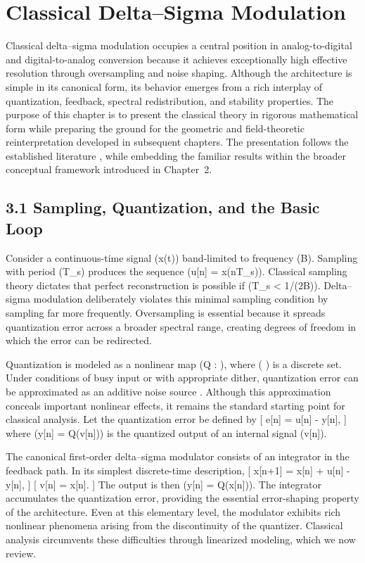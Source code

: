 \chapter{Classical Delta--Sigma Modulation}

Classical delta--sigma modulation occupies a central position in analog-to-digital and digital-to-analog conversion because it achieves exceptionally high effective resolution through oversampling and noise shaping. Although the architecture is simple in its canonical form, its behavior emerges from a rich interplay of quantization, feedback, spectral redistribution, and stability properties. The purpose of this chapter is to present the classical theory in rigorous mathematical form while preparing the ground for the geometric and field-theoretic reinterpretation developed in subsequent chapters. The presentation follows the established literature \citep{candy1992oversampling,schreier2005understanding}, while embedding the familiar results within the broader conceptual framework introduced in Chapter~2.

\section*{3.1 Sampling, Quantization, and the Basic Loop}

Consider a continuous-time signal (x(t)) band-limited to frequency (B). Sampling with period (T_s) produces the sequence (u[n] = x(nT_s)). Classical sampling theory dictates that perfect reconstruction is possible if (T_s < 1/(2B)). Delta--sigma modulation deliberately violates this minimal sampling condition by sampling far more frequently. Oversampling is essential because it spreads quantization error across a broader spectral range, creating degrees of freedom in which the error can be redirected.

Quantization is modeled as a nonlinear map (Q :  \to \Lambda), where ( \Lambda ) is a discrete set. Under conditions of busy input or with appropriate dither, quantization error can be approximated as an additive noise source \citep{widrow1956statistical,jayant1993digital}. Although this approximation conceals important nonlinear effects, it remains the standard starting point for classical analysis. Let the quantization error be defined by
[
e[n] = u[n] - y[n],
]
where (y[n] = Q(v[n])) is the quantized output of an internal signal (v[n]).

The canonical first-order delta--sigma modulator consists of an integrator in the feedback path. In its simplest discrete-time description,
[
x[n+1] = x[n] + u[n] - y[n],
]
[
v[n] = x[n].
]
The output is then (y[n] = Q(x[n])). The integrator accumulates the quantization error, providing the essential error-shaping property of the architecture. Even at this elementary level, the modulator exhibits rich nonlinear phenomena arising from the discontinuity of the quantizer. Classical analysis circumvents these difficulties through linearized modeling, which we now review.


